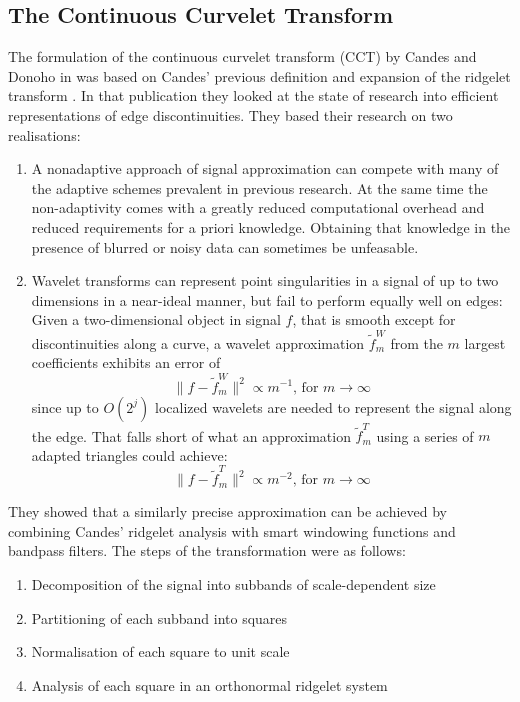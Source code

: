 \subsection{The Continuous Curvelet Transform}\label{sec:background_cct}

The formulation of the continuous curvelet transform (CCT) by Candes and Donoho
in \autocite{candes_curvelets:_2000} was based on Candes' previous definition and
expansion of the ridgelet transform \autocite{candes_ridgelets:_1998}. In that
publication they looked at the state of research into efficient representations
of edge discontinuities. They based their research on two realisations:
\begin{enumerate}
    \item A nonadaptive approach of signal approximation can compete with many
        of the adaptive schemes prevalent in previous research. At the same
        time the non-adaptivity comes with a greatly reduced computational
        overhead and reduced requirements for a priori knowledge. Obtaining
        that knowledge in the presence of blurred or noisy data can sometimes
        be unfeasable.
    \item Wavelet transforms can represent point singularities in a signal of
        up to two dimensions in a near-ideal manner, but fail to perform
        equally well on edges: Given a two-dimensional object in signal $f$, that
        is smooth except for discontinuities along a curve, a wavelet
        approximation $\tilde{f}^W_m$ from the $m$ largest coefficients
        exhibits an error of
        \begin{equation*}
            \| f - \tilde{f}^W_m \|^2 \propto m^{-1} \text{, for } m \rightarrow \infty
        \end{equation*}
        since up to $O(2^j)$ localized wavelets are needed to represent the
        signal along the edge. That falls short of what an approximation
        $\tilde{f}^T_m$ using a series of $m$ adapted triangles could achieve:
        \begin{equation*}
            \| f - \tilde{f}^T_m \|^2 \propto m^{-2} \text{, for } m \rightarrow \infty
        \end{equation*}
\end{enumerate}
They showed that a similarly precise approximation can be achieved by combining
Candes' ridgelet analysis \autocite{candes_ridgelets:_1998} with smart
windowing functions and bandpass filters. The steps of the transformation were
as follows:
\begin{enumerate}
    \item Decomposition of the signal into subbands of scale-dependent size
    \item Partitioning of each subband into squares
    \item Normalisation of each square to unit scale
    \item Analysis of each square in an orthonormal ridgelet system
\end{enumerate}

